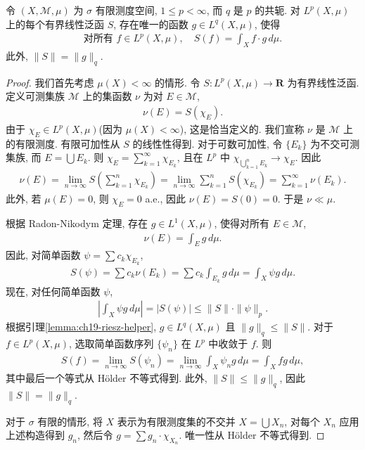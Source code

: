 \documentclass[../../main.tex]{subfiles}
\begin{document}
\begin{theorem}\label{theorem:ch19-riesz}
令 $(X,\mathcal{M},\mu)$ 为 $\sigma$ 有限测度空间, $1\leqslant p<\infty$, 而 $q$ 是 $p$ 的共轭. 对 $L^{p}(X,\mu)$ 上的每个有界线性泛函 $S$, 存在唯一的函数 $g\in L^{q}(X,\mu)$, 使得
\begin{align}
\text{对所有 }f\in L^{p}(X,\mu),\quad S(f)=\int_{X}f\cdot g\,d\mu.\label{align:ch19-riesz-theorem}
\end{align}
此外, $\|S\|=\|g\|_{q}$.
\end{theorem}

\begin{proof}
我们首先考虑 $\mu(X)<\infty$ 的情形. 令 $S:L^{p}(X,\mu)\to\mathbf{R}$ 为有界线性泛函. 定义可测集族 $\mathcal{M}$ 上的集函数 $\nu$ 为对 $E\in\mathcal{M}$,
\begin{align*}
\nu(E)=S(\chi_{E}).
\end{align*}
由于 $\chi_{E}\in L^{p}(X,\mu)$(因为 $\mu(X)<\infty$), 这是恰当定义的. 我们宣称 $\nu$ 是 $\mathcal{M}$ 上的有限测度. 有限可加性从 $S$ 的线性性得到. 对于可数可加性, 令 $\{E_{k}\}$ 为不交可测集族, 而 $E=\bigcup E_{k}$. 则 $\chi_{E}=\sum_{k=1}^{\infty}\chi_{E_{k}}$, 且在 $L^{p}$ 中 $\chi_{\bigcup_{k=1}^{n}E_{k}}\to\chi_{E}$. 因此
\begin{align*}
\nu(E)=\lim_{n\to\infty}S\left(\sum_{k=1}^{n}\chi_{E_{k}}\right)=\lim_{n\to\infty}\sum_{k=1}^{n}S(\chi_{E_{k}})=\sum_{k=1}^{\infty}\nu(E_{k}).
\end{align*}
此外, 若 $\mu(E)=0$, 则 $\chi_{E}=0$ a.e., 因此 $\nu(E)=S(0)=0$. 于是 $\nu\ll\mu$.

根据 Radon-Nikodym 定理, 存在 $g\in L^{1}(X,\mu)$, 使得对所有 $E\in\mathcal{M}$,
\begin{align*}
\nu(E)=\int_{E}g\,d\mu.
\end{align*}
因此, 对简单函数 $\psi=\sum c_{k}\chi_{E_{k}}$,
\begin{align*}
S(\psi)=\sum c_{k}\nu(E_{k})=\sum c_{k}\int_{E_{k}}g\,d\mu=\int_{X}\psi g\,d\mu.
\end{align*}
现在, 对任何简单函数 $\psi$,
\begin{align*}
\left|\int_{X}\psi g\,d\mu\right|=|S(\psi)|\leqslant\|S\|\cdot\|\psi\|_{p}.
\end{align*}
根据引理\cref{lemma:ch19-riesz-helper}, $g\in L^{q}(X,\mu)$ 且 $\|g\|_{q}\leqslant\|S\|$. 对于 $f\in L^{p}(X,\mu)$, 选取简单函数序列 $\{\psi_{n}\}$ 在 $L^{p}$ 中收敛于 $f$. 则
\begin{align*}
S(f)=\lim_{n\to\infty}S(\psi_{n})=\lim_{n\to\infty}\int_{X}\psi_{n}g\,d\mu=\int_{X}fg\,d\mu,
\end{align*}
其中最后一个等式从 H\"older 不等式得到. 此外, $\|S\|\leqslant\|g\|_{q}$, 因此 $\|S\|=\|g\|_{q}$.

对于 $\sigma$ 有限的情形, 将 $X$ 表示为有限测度集的不交并 $X=\bigcup X_{n}$, 对每个 $X_{n}$ 应用上述构造得到 $g_{n}$, 然后令 $g=\sum g_{n}\cdot\chi_{X_{n}}$. 唯一性从 H\"older 不等式得到.
\end{proof}
\end{document}
